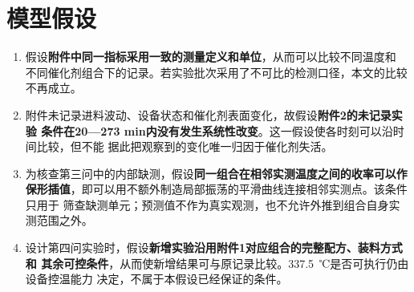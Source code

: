 \section{模型假设}\label{sec:assumptions}

\begin{enumerate}
\def\labelenumi{\arabic{enumi}.}
\item
  假设\textbf{附件中同一指标采用一致的测量定义和单位}，从而可以比较不同温度和
  不同催化剂组合下的记录。若实验批次采用了不可比的检测口径，本文的比较不再成立。
\item
  附件未记录进料波动、设备状态和催化剂表面变化，故假设\textbf{附件2的未记录实验
  条件在20---273 min内没有发生系统性改变}。这一假设使各时刻可以沿时间比较，但不能
  据此把观察到的变化唯一归因于催化剂失活。
\item
  为核查第三问中的内部缺测，假设\textbf{同一组合在相邻实测温度之间的收率可以作
  保形插值}，即可以用不额外制造局部振荡的平滑曲线连接相邻实测点。该条件只用于
  筛查缺测单元；预测值不作为真实观测，也不允许外推到组合自身实测范围之外。
\item
  设计第四问实验时，假设\textbf{新增实验沿用附件1对应组合的完整配方、装料方式和
  其余可控条件}，从而使新增结果可与原记录比较。337.5~℃是否可执行仍由设备控温能力
  决定，不属于本假设已经保证的条件。
\end{enumerate}
